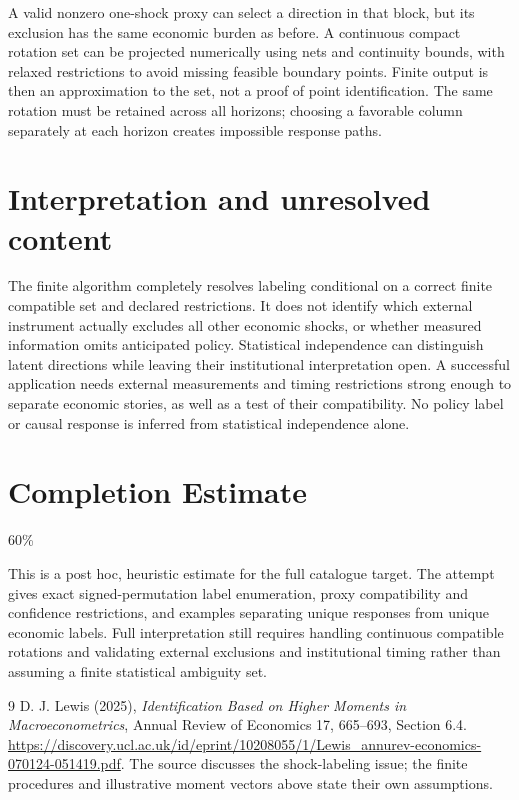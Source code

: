 \documentclass[11pt,a4paper]{article}
\begin{document}
A valid nonzero one-shock proxy can select a direction in that block, but its exclusion has the same economic burden as before. A continuous compact rotation set can be projected numerically using nets and continuity bounds, with relaxed restrictions to avoid missing feasible boundary points. Finite output is then an approximation to the set, not a proof of point identification. The same rotation must be retained across all horizons; choosing a favorable column separately at each horizon creates impossible response paths.

\section{Interpretation and unresolved content}
The finite algorithm completely resolves labeling conditional on a correct finite compatible set and declared restrictions. It does not identify which external instrument actually excludes all other economic shocks, or whether measured information omits anticipated policy. Statistical independence can distinguish latent directions while leaving their institutional interpretation open. A successful application needs external measurements and timing restrictions strong enough to separate economic stories, as well as a test of their compatibility. No policy label or causal response is inferred from statistical independence alone.

\section{Completion Estimate}
60\%

This is a post hoc, heuristic estimate for the full catalogue target.
The attempt gives exact signed-permutation label enumeration, proxy compatibility and confidence restrictions, and examples separating unique responses from unique economic labels. Full interpretation still requires handling continuous compatible rotations and validating external exclusions and institutional timing rather than assuming a finite statistical ambiguity set.

\begin{thebibliography}{9}
 D. J. Lewis (2025), \emph{Identification Based on Higher Moments in Macroeconometrics}, Annual Review of Economics 17, 665--693, Section 6.4. \url{https://discovery.ucl.ac.uk/id/eprint/10208055/1/Lewis_annurev-economics-070124-051419.pdf}. The source discusses the shock-labeling issue; the finite procedures and illustrative moment vectors above state their own assumptions.
\end{thebibliography}
\end{document}
